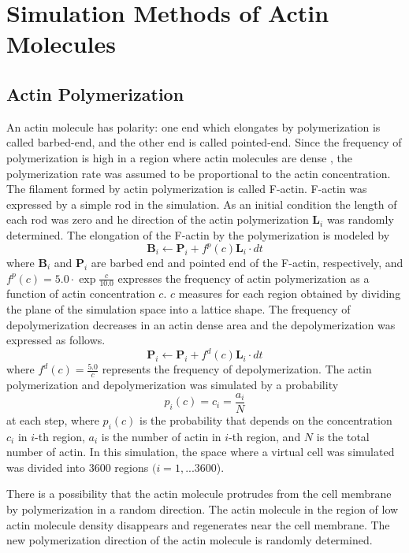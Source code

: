 \documentclass[a4paper,12pt, oneside]{book}
\begin{document}
\section{Simulation Methods of Actin Molecules}
\subsection{Actin Polymerization}
An actin molecule has polarity: one end which elongates by  polymerization is called barbed-end, and the other end is called pointed-end.
Since the frequency of polymerization is high in a region where actin molecules are dense \cite{svitkina1997analysis}, the polymerization rate was assumed to be  proportional to the actin concentration.
The filament formed by actin polymerization is called F-actin.
F-actin was expressed by a simple  rod in the simulation. 
As an initial condition the length of each rod was zero and he direction of the actin polymerization $\bm{L}_i$ was  randomly determined.
The elongation of the F-actin by the polymerization is modeled by
\begin{equation}
\bm{B}_i \gets \bm{P}_i + f^p(c)\bm{L}_i \cdot dt
\end{equation}
where $\bm{B}_i$ and $\bm{P}_i$ are barbed end and pointed end of the F-actin, respectively, and $f^p(c) = 5.0 \cdot \exp{\frac{c}{10.0}}$ expresses the frequency of actin polymerization as a function of actin concentration $c$.
$c$ measures for each region obtained by dividing the plane of the simulation space into a lattice shape.
The frequency of depolymerization decreases in an actin dense area and the depolymerization was expressed  as follows.
\begin{equation}
\bm{P}_i \gets \bm{P}_i + f^d(c)\bm{L}_i \cdot dt
\end{equation}
where $f^d(c) = \frac{5.0}{c}$ represents the frequency of depolymerization. 
The actin polymerization and depolymerization was simulated by a probability  \[p_i(c) = c_i = \frac{a_i}{N}\] at each step, where $p_i(c)$ is the probability that depends on the concentration $c_i$ in $i$-th region, $a_i$ is the number of actin in $i$-th region, and $N$ is the total number of actin.
In this simulation, the space where a virtual cell was simulated was divided into $3600$ regions $(i = 1,...3600$).

There is a possibility that the actin molecule protrudes from the cell membrane by polymerization in a random direction.
The actin molecule in the region of low actin molecule density disappears and regenerates near the cell membrane.
The new polymerization direction of the actin molecule is randomly determined.
\end{document}
